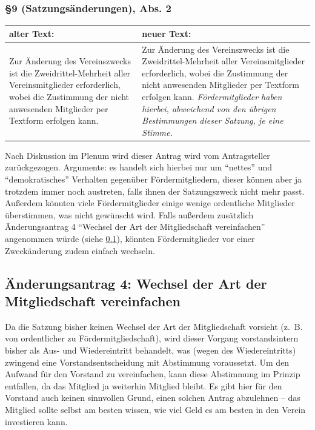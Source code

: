 \documentclass[a4paper,12pt]{scrartcl}
\begin{document}
\subsubsection*{§9 (Satzungsänderungen), Abs. 2}
\begin{longtable}[c]{@{}ll@{}}
\toprule
\begin{minipage}[b]{0.47\columnwidth}\raggedright\strut
alter Text:
\strut\end{minipage} &
\begin{minipage}[b]{0.47\columnwidth}\raggedright\strut
neuer Text:
\strut\end{minipage}\tabularnewline
\midrule
\endhead
\begin{minipage}[t]{0.47\columnwidth}\raggedright\strut
Zur Änderung des Vereinszwecks ist die Zweidrittel-Mehrheit aller
Vereinsmitglieder erforderlich, wobei die Zustimmung der nicht
anwesenden Mitglieder per Textform erfolgen kann.
\strut\end{minipage} &
\begin{minipage}[t]{0.47\columnwidth}\raggedright\strut
Zur Änderung des Vereinszwecks ist die Zweidrittel-Mehrheit aller
Vereinsmitglieder erforderlich, wobei die Zustimmung der nicht
anwesenden Mitglieder per Textform erfolgen kann. \emph{Fördermitglieder haben
hierbei, abweichend von den übrigen Bestimmungen dieser Satzung, je eine
Stimme.}
\strut\end{minipage}\tabularnewline
\bottomrule
\end{longtable}

\withdrawn
Nach Diskussion im Plenum wird dieser Antrag wird vom Antragsteller
zurückgezogen. Argumente: es handelt sich hierbei nur um "`nettes"' und
"`demokratisches"' Verhalten gegenüber Fördermitgliedern, dieser können aber ja
trotzdem immer noch austreten, falls ihnen der Satzungszweck nicht mehr passt.
Außerdem könnten viele Fördermitglieder einige wenige ordentliche Mitglieder
überstimmen, was nicht gewünscht wird. Falls außerdem zusätzlich Änderungsantrag
4 "`Wechsel der Art der Mitgliedschaft vereinfachen"' angenommen würde (siehe
\ref{uxe4nderungsantrag-4-wechsel-der-art-der-mitgliedschaft-vereinfachen}),
könnten Fördermitglieder vor einer Zweckänderung zudem einfach wechseln.


\subsection{Änderungsantrag 4: Wechsel der Art der Mitgliedschaft vereinfachen}
\label{uxe4nderungsantrag-4-wechsel-der-art-der-mitgliedschaft-vereinfachen}
Da die Satzung bisher keinen Wechsel der Art der Mitgliedschaft vorsieht
(z.~B. von ordentlicher zu Fördermitgliedschaft), wird dieser Vorgang
vorstandsintern bisher als Aus- und Wiedereintritt behandelt, was (wegen
des Wiedereintritts) zwingend eine Vorstandsentscheidung mit Abstimmung
voraussetzt. Um den Aufwand für den Vorstand zu vereinfachen, kann diese
Abstimmung im Prinzip entfallen, da das Mitglied ja weiterhin Mitglied
bleibt. Es gibt hier für den Vorstand auch keinen sinnvollen Grund,
einen solchen Antrag abzulehnen -- das Mitglied sollte selbst am besten
wissen, wie viel Geld es am besten in den Verein investieren kann.
\end{document}
